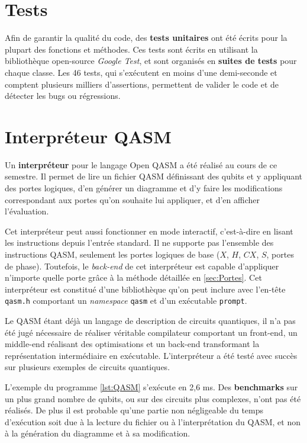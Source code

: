 \section{Tests}

Afin de garantir la qualité du code, des \textbf{tests unitaires} ont été écrits pour la plupart des fonctions et méthodes. Ces tests sont écrits en utilisant la bibliothèque open-source \textit{Google Test}, et sont organisés en \textbf{suites de tests} pour chaque classe. \cite{GoogleTest} Les 46 tests, qui s'exécutent en moins d'une demi-seconde et comptent plusieurs milliers d'assertions, permettent de valider le code et de détecter les bugs ou régressions.

\section{Interpréteur QASM}

Un \textbf{interpréteur} pour le langage Open QASM a été réalisé au cours de ce semestre. Il permet de lire un fichier QASM définissant des qubits et y appliquant des portes logiques, d'en générer un diagramme et d'y faire les modifications correspondant aux portes qu'on souhaite lui appliquer, et d'en afficher l'évaluation.

Cet interpréteur peut aussi fonctionner en mode interactif, c'est-à-dire en lisant les instructions depuis l'entrée standard. Il ne supporte pas l'ensemble des instructions QASM, seulement les portes logiques de base ($X$, $H$, $CX$, $S$, portes de phase). Toutefois, le \textit{back-end} de cet interpréteur est capable d'appliquer n'importe quelle porte grâce à la méthode détaillée en \autoref{sec:Portes}. Cet interpréteur est constitué d'une bibliothèque qu'on peut inclure avec l'en-tête \texttt{qasm.h} comportant un \textit{namespace} \texttt{qasm} et d'un exécutable \texttt{prompt}.

Le QASM étant déjà un langage de description de circuits quantiques, il n'a pas été jugé nécessaire de réaliser véritable compilateur comportant un front-end, un middle-end réalisant des optimisations et un back-end transformant la représentation intermédiaire en exécutable. L'interpréteur a été testé avec succès sur plusieurs exemples de circuits quantiques.

L'exemple du programme \ref{lst:QASM} s'exécute en 2,6 ms. Des \textbf{benchmarks} sur un plus grand nombre de qubits, ou sur des circuits plus complexes, n'ont pas été réalisés. De plus il est probable qu'une partie non négligeable du temps d'exécution soit due à la lecture du fichier ou à l'interprétation du QASM, et non à la génération du diagramme et à sa modification.


